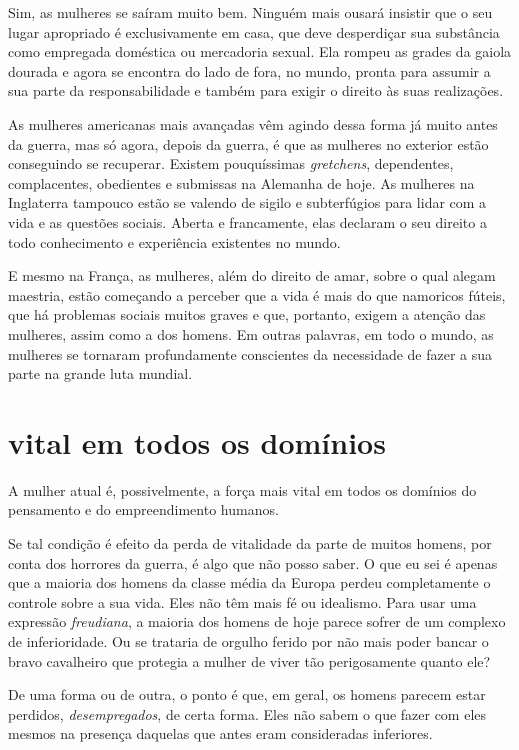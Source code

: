 Sim, as mulheres se saíram muito bem. Ninguém mais ousará
insistir que o seu lugar apropriado é exclusivamente em casa, que deve
desperdiçar sua substância como empregada doméstica ou mercadoria
sexual. Ela rompeu as grades da gaiola dourada e agora se encontra do
lado de fora, no mundo, pronta para assumir a sua parte da
responsabilidade e também para exigir o direito às suas realizações.

As mulheres americanas mais avançadas vêm agindo dessa forma já muito
antes da guerra, mas só agora, depois da guerra, é que as mulheres no
exterior estão conseguindo se recuperar. Existem pouquíssimas
\textit{gretchens}, dependentes, complacentes, obedientes e submissas na
Alemanha de hoje. As mulheres na Inglaterra tampouco estão se valendo de
sigilo e subterfúgios para lidar com a vida e as questões sociais.
Aberta e francamente, elas declaram o seu direito a todo
conhecimento e experiência existentes no mundo.

E mesmo na França, as mulheres, além do direito de amar, sobre o qual
alegam maestria, estão começando a perceber que a vida é mais do que
namoricos fúteis, que há problemas sociais muitos graves e que,
portanto, exigem a atenção das mulheres, assim como a dos homens. Em
outras palavras, em todo o mundo, as mulheres se tornaram profundamente
conscientes da necessidade de fazer a sua parte na grande luta mundial.

\section{vital em todos os domínios}

A mulher atual é, possivelmente, a força mais vital em todos os domínios
do pensamento e do empreendimento humanos.

Se tal condição é efeito da perda de vitalidade da parte de muitos homens, por
conta dos horrores da guerra, é algo que não posso saber. O que eu sei é
apenas que a maioria dos homens da classe média da Europa perdeu completamente o
controle sobre a sua vida. Eles não têm mais fé ou idealismo. Para usar
uma expressão \textit{freudiana}, a maioria dos homens de hoje parece sofrer
de um complexo de inferioridade. Ou se trataria de orgulho ferido por
não mais poder bancar o bravo cavalheiro que protegia a mulher de viver
tão perigosamente quanto ele?

De uma forma ou de outra, o ponto é que, em geral, os homens parecem
estar perdidos, \textit{desempregados}, de certa forma. Eles não sabem o que
fazer com eles mesmos na presença daquelas que antes eram consideradas
inferiores.


